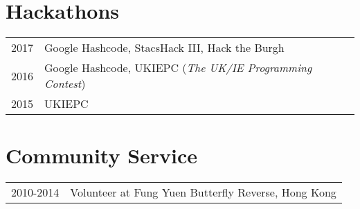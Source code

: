 \documentclass{article}
\begin{document}
\section*{Hackathons}
\begin{tabular}{r|p{14cm}}
\textsc{2017} & Google Hashcode, StacsHack III, Hack the Burgh \\
\textsc{2016} & Google Hashcode, UKIEPC (\textit{The UK/IE Programming Contest}) \\
\textsc{2015} & UKIEPC \\
\end{tabular}
\section*{Community Service}
\begin{tabular}{r|p{14cm}}
\textsc{2010-2014} & Volunteer at Fung Yuen Butterfly Reverse, Hong Kong \\
\end{tabular}
\end{document}
